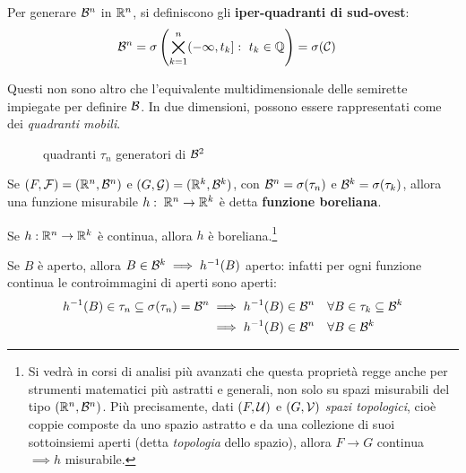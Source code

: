\medskip
\begin{defn}
  \label{def-iperquadranti}
  Per generare $\mathcal B^n$ in $\mathbb R^n$, si definiscono gli \textbf{iper-quadranti di sud-ovest}:
  $$\mathcal B^n = \sigma \left( \bigtimes\limits_{k=1}^{n} (-\infty, t_k]: \ t_k \in \mathbb Q \right) = \sigma(\mathcal C) \quad$$
\end{defn}
Questi non sono altro che l'equivalente multidimensionale delle semirette impiegate per definire $\mathcal B$. In due dimensioni, possono essere rappresentati come dei \textit{quadranti mobili}.

\begin{figure}[H]
  \centering
  
  \caption{quadranti $\tau_n$ generatori di $\mathcal B^2$}\label{quadranti-mobili}
\end{figure}

\begin{defn}
  Se $(F, \mathcal F) = (\mathbb R^n, \mathcal B^n)$ e $(G, \mathcal G) = (\mathbb R^k, \mathcal B^k)$, con $\mathcal B^n = \sigma(\tau_n)$ e $\mathcal B^k = \sigma(\tau_k)$, allora una funzione misurabile $h: \; \mathbb R^n \to \mathbb R^k$ è detta \textbf{funzione boreliana}.
\end{defn}

\medskip
\begin{propb}[\JPTh{8.3}]
  Se $h:\mathbb R^n \to \mathbb R^k$ è continua, allora $h$ è boreliana.\footnote{Si vedrà in corsi di analisi più avanzati che questa proprietà regge anche per strumenti matematici più astratti e generali, non solo su spazi misurabili del tipo $(\mathbb R^n, \mathcal B^n)$.
  	Più precisamente, dati $(F, \mathcal U)$ e $(G, \mathcal V)$ \emph{spazi topologici}, cioè coppie composte da uno spazio astratto e da una collezione di suoi sottoinsiemi aperti (detta \emph{topologia} dello spazio), allora $F \to G$ continua $\implies h$ misurabile.}
\end{propb}

\begin{dimo}\belowdisplayskip=-13pt
  Se $B$ è aperto, allora $B \in \mathcal B^k \implies h^{-1}(B)$ aperto: infatti per ogni funzione continua le controimmagini di aperti sono aperti:
  \begin{align*}
    h^{-1}(B) \in \tau_n \subseteq \sigma(\tau_n) = \mathcal B^n
    &\implies h^{-1}(B) \in \mathcal B^n \quad \forall B \in \tau_k \subseteq \mathcal B^k\\
    &\implies h^{-1}(B) \in \mathcal B^n \quad \forall B \in \mathcal B^k
  \end{align*}\qedhere
\end{dimo}

